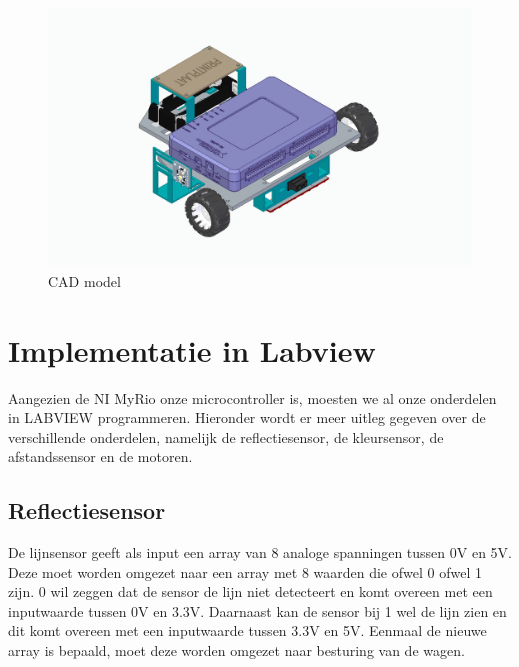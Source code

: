 \documentclass[twoside,kulak]{kulakreport} %
\begin{document}
	\begin{figure}[h]
	\centering
	\includegraphics[width=\textwidth]{FotoChassisVerslag (2)}
	\caption{CAD model}
	\label{fig:chassis2}
	\end{figure}
	\clearpage
		
	\section{Implementatie in Labview}
	Aangezien de NI MyRio onze microcontroller is, moesten we al onze onderdelen in LABVIEW programmeren. Hieronder wordt er meer uitleg gegeven over de verschillende onderdelen, namelijk de reflectiesensor, de kleursensor, de afstandssensor en de motoren.
		\subsection{Reflectiesensor}
		De lijnsensor geeft als input een array van 8 analoge spanningen tussen 0V en 5V. Deze moet worden omgezet naar een array met 8 waarden die ofwel 0 ofwel 1 zijn. 0 wil zeggen dat de sensor de lijn niet detecteert en komt overeen met een inputwaarde tussen 0V en 3.3V. Daarnaast kan de sensor bij 1 wel de lijn zien en dit komt overeen met een inputwaarde tussen 3.3V en 5V. Eenmaal de nieuwe array is bepaald, moet deze worden omgezet naar besturing van de wagen. 
		
\end{document}

